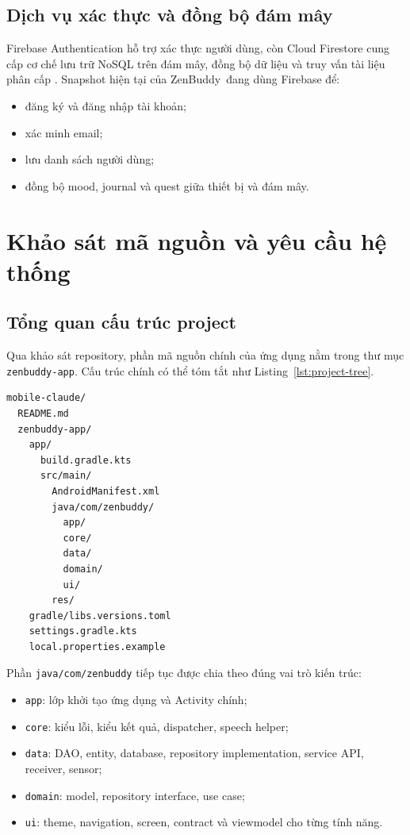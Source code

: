 \documentclass{zenbuddy-report}
\newcommand{\appname}{ZenBuddy}
\begin{document}
\section{Dịch vụ xác thực và đồng bộ đám mây}
Firebase Authentication hỗ trợ xác thực người dùng, còn Cloud Firestore cung cấp cơ chế lưu trữ NoSQL trên đám mây, đồng bộ dữ liệu và truy vấn tài liệu phân cấp \cite{firebase-auth,firebase-firestore}. Snapshot hiện tại của \appname\ đang dùng Firebase để:
\begin{itemize}
  \item đăng ký và đăng nhập tài khoản;
  \item xác minh email;
  \item lưu danh sách người dùng;
  \item đồng bộ mood, journal và quest giữa thiết bị và đám mây.
\end{itemize}

\chapter{Khảo sát mã nguồn và yêu cầu hệ thống}

\section{Tổng quan cấu trúc project}
Qua khảo sát repository, phần mã nguồn chính của ứng dụng nằm trong thư mục \texttt{zenbuddy-app}. Cấu trúc chính có thể tóm tắt như Listing~\ref{lst:project-tree}.

\begin{lstlisting}[caption={Cấu trúc thư mục chính của project},label={lst:project-tree}]
mobile-claude/
  README.md
  zenbuddy-app/
    app/
      build.gradle.kts
      src/main/
        AndroidManifest.xml
        java/com/zenbuddy/
          app/
          core/
          data/
          domain/
          ui/
        res/
    gradle/libs.versions.toml
    settings.gradle.kts
    local.properties.example
\end{lstlisting}

Phần \texttt{java/com/zenbuddy} tiếp tục được chia theo đúng vai trò kiến trúc:
\begin{itemize}
  \item \texttt{app}: lớp khởi tạo ứng dụng và Activity chính;
  \item \texttt{core}: kiểu lỗi, kiểu kết quả, dispatcher, speech helper;
  \item \texttt{data}: DAO, entity, database, repository implementation, service API, receiver, sensor;
  \item \texttt{domain}: model, repository interface, use case;
  \item \texttt{ui}: theme, navigation, screen, contract và viewmodel cho từng tính năng.
\end{itemize}
\end{document}
